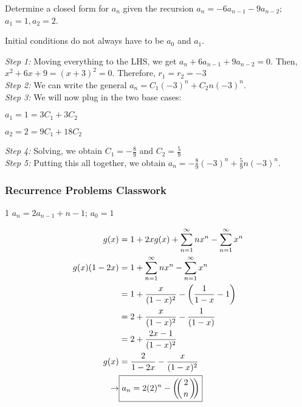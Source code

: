 \begin{example}{}
    Determine a closed form for $a_n$ given the recursion $a_n = -6a_{n-1} - 9a_{n-2}$; $a_1 = 1, a_2 = 2$. 
\end{example}

\begin{remark}
    Initial conditions do not always have to be $a_0$ and $a_1$. 
\end{remark}

\begin{solution}
    \textit{Step 1:} Moving everything to the LHS, we get $a_n + 6a_{n-1} + 9 a_{n-2} = 0$. 
    Then, $x^2 + 6x + 9 = (x+3)^2 = 0$. Therefore, $r_1 = r_2 = -3$ \\
    
    \textit{Step 2:} We can write the general $a_n = C_1 (-3)^n + C_2 n(-3)^n$. \\
    
    \textit{Step 3:} We will now plug in the two base cases:
    
    \qquad $a_1 = 1 = 3C_1 + 3C_2$
    
    \qquad $a_2 = 2 = 9 C_1 + 18C_2$
    \newline 
    
    \textit{Step 4:} Solving, we obtain $C_1 = -\frac 89$ and $C_2 = \frac 59$\\
    
    \textit{Step 5:} Putting this all together, we obtain $\boxed{a_n = -\frac 89 (-3)^n + \frac 59 n(-3)^n}$. 
    
\end{solution}

\subsubsection*{Recurrence Problems Classwork}
\begin{example}1
    $a_n = 2a_{n-1} + n - 1$; $a_0 = 1$
\end{example}
\begin{solution}
\begin{align*}
    g(x) &= 1 + 2xg(x) + \sum_{n=1}^\infty nx^n - \sum_{n=1}^\infty x^n \\
    g(x) (1-2x) &= 1 + \sum_{n=1}^\infty nx^n - \sum_{n=1}^\infty x^n \\
    &= 1 + \frac x{(1-x)^2} - \left( \frac 1{1-x} - 1\right) \\ 
    &= 2 + \frac x{(1-x)^2} - \frac 1{(1-x)} \\
    &= 2 + \frac{2x - 1}{(1-x)^2} \\
    g(x) &= \frac 2{1-2x} - \frac x{(1-x)^2} \\
    \rightarrow &\boxed{a_n = 2(2)^n - \snb 2 n}
\end{align*}
\end{solution}